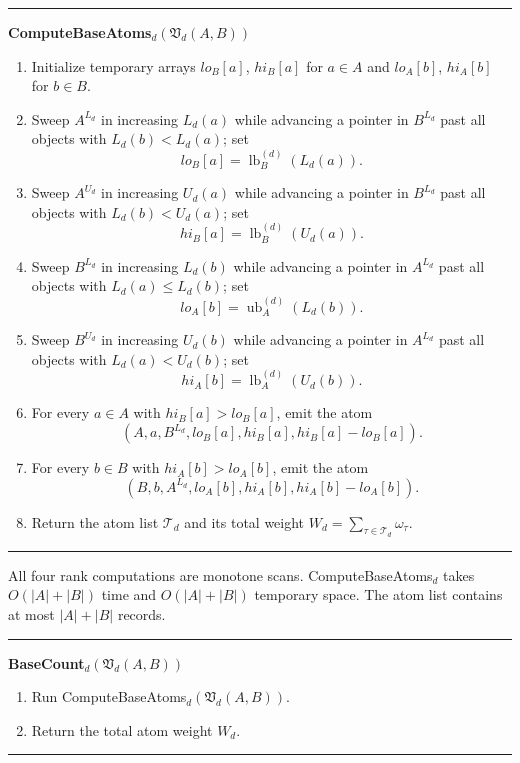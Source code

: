 \documentclass[11pt]{article}
\newcommand{\lb}{\operatorname{lb}}
\newcommand{\ub}{\operatorname{ub}}
\theoremstyle{definition}
\newenvironment{algorithmbox}[1]{%
  \par\medskip\noindent\hrule\smallskip
  \noindent\textbf{#1}\par\smallskip
  \begin{enumerate}[leftmargin=1.7em,itemsep=2pt,topsep=2pt]
}{%
  \end{enumerate}
  \smallskip\hrule\medskip
}
\begin{document}
\begin{algorithmbox}{ComputeBaseAtoms$_d(\mathfrak V_d(A,B))$}
\item Initialize temporary arrays $lo_B[a]$, $hi_B[a]$ for $a\in A$ and $lo_A[b]$, $hi_A[b]$ for $b\in B$.
\item Sweep $A^{L_d}$ in increasing $L_d(a)$ while advancing a pointer in $B^{L_d}$ past all objects with $L_d(b)<L_d(a)$; set
\[
  lo_B[a]=\lb_B^{(d)}(L_d(a)).
\]
\item Sweep $A^{U_d}$ in increasing $U_d(a)$ while advancing a pointer in $B^{L_d}$ past all objects with $L_d(b)<U_d(a)$; set
\[
  hi_B[a]=\lb_B^{(d)}(U_d(a)).
\]
\item Sweep $B^{L_d}$ in increasing $L_d(b)$ while advancing a pointer in $A^{L_d}$ past all objects with $L_d(a)\le L_d(b)$; set
\[
  lo_A[b]=\ub_A^{(d)}(L_d(b)).
\]
\item Sweep $B^{U_d}$ in increasing $U_d(b)$ while advancing a pointer in $A^{L_d}$ past all objects with $L_d(a)<U_d(b)$; set
\[
  hi_A[b]=\lb_A^{(d)}(U_d(b)).
\]
\item For every $a\in A$ with $hi_B[a]>lo_B[a]$, emit the atom
\[
  (A,a,B^{L_d},lo_B[a],hi_B[a],hi_B[a]-lo_B[a]).
\]
\item For every $b\in B$ with $hi_A[b]>lo_A[b]$, emit the atom
\[
  (B,b,A^{L_d},lo_A[b],hi_A[b],hi_A[b]-lo_A[b]).
\]
\item Return the atom list $\mathcal T_d$ and its total weight $W_d=\sum_{\tau\in\mathcal T_d}\omega_\tau$.
\end{algorithmbox}

All four rank computations are monotone scans.  ComputeBaseAtoms$_d$ takes $O(|A|+|B|)$ time and $O(|A|+|B|)$ temporary space.  The atom list contains at most $|A|+|B|$ records.

\begin{algorithmbox}{BaseCount$_d(\mathfrak V_d(A,B))$}
\item Run ComputeBaseAtoms$_d(\mathfrak V_d(A,B))$.
\item Return the total atom weight $W_d$.
\end{algorithmbox}
\end{document}
